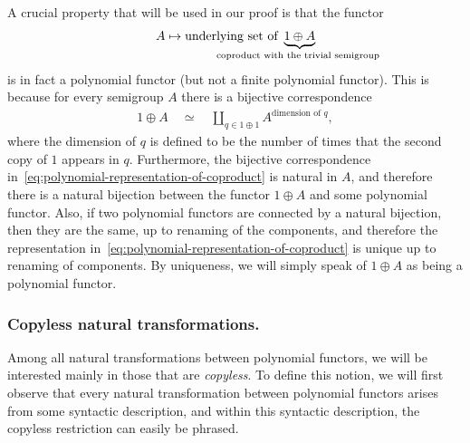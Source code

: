 \begin{myexample}\label{ex:coproduct-as-polynomial-functor}
    A crucial property that will be used in our proof is that the functor
    \begin{align*}
    A \mapsto \text{underlying set of}\ \myunderbrace{1 \oplus A}{\text{coproduct with the trivial semigroup}}
    \end{align*}
    is in fact a polynomial functor (but not a finite polynomial functor).  This is because for every semigroup $A$ there is a bijective correspondence 
    \begin{align}\label{eq:polynomial-representation-of-coproduct}
    1 \oplus A \quad \simeq \quad \coprod_{q \in 1 \oplus 1} A^{\text{dimension of $q$}},
    \end{align}
    where the dimension of $q$ is defined to be the number of times that the second copy of $1$ appears in $q$. Furthermore, the bijective correspondence in~\eqref{eq:polynomial-representation-of-coproduct} is natural in $A$, and therefore there is a natural bijection between the functor $1 \oplus A$ and some polynomial functor. Also, if two polynomial functors are connected by a natural bijection, then they are the same, up to renaming of the components, and therefore the representation in~\eqref{eq:polynomial-representation-of-coproduct} is unique up to renaming of components. By uniqueness, we will simply speak of $1 \oplus A$ as being a polynomial functor. 
\end{myexample}




\subsubsection{Copyless natural transformations.}  Among all natural  transformations between polynomial functors, we will be interested mainly in those that are  \emph{copyless}. To define this notion, we will first observe that  every natural transformation between polynomial functors  arises from some syntactic description, and within this syntactic description, the copyless restriction can easily be phrased. 

